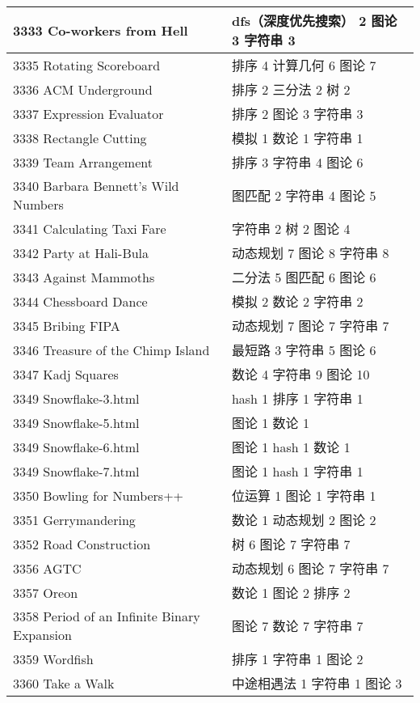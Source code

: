 \begin{longtable}{| p{} | p{} |}
 3333 Co-workers from Hell  & dfs（深度优先搜索） 2 图论 3 字符串 3 \\ \hline
 3335 Rotating Scoreboard  & 排序 4 计算几何 6 图论 7 \\ \hline
 3336 ACM Underground  & 排序 2 三分法 2 树 2 \\ \hline
 3337 Expression Evaluator  & 排序 2 图论 3 字符串 3 \\ \hline
 3338 Rectangle Cutting  & 模拟 1 数论 1 字符串 1 \\ \hline
 3339 Team Arrangement  & 排序 3 字符串 4 图论 6 \\ \hline
 3340 Barbara Bennett's Wild Numbers  & 图匹配 2 字符串 4 图论 5 \\ \hline
 3341 Calculating Taxi Fare  & 字符串 2 树 2 图论 4 \\ \hline
 3342 Party at Hali-Bula  & 动态规划 7 图论 8 字符串 8 \\ \hline
 3343 Against Mammoths  & 二分法 5 图匹配 6 图论 6 \\ \hline
 3344 Chessboard Dance  & 模拟 2 数论 2 字符串 2 \\ \hline
 3345 Bribing FIPA  & 动态规划 7 图论 7 字符串 7 \\ \hline
 3346 Treasure of the Chimp Island  & 最短路 3 字符串 5 图论 6 \\ \hline
 3347 Kadj Squares  & 数论 4 字符串 9 图论 10 \\ \hline
 3349 Snowflake-3.html & hash 1 排序 1 字符串 1 \\ \hline
 3349 Snowflake-5.html & 图论 1 数论 1 \\ \hline
 3349 Snowflake-6.html & 图论 1 hash 1 数论 1 \\ \hline
 3349 Snowflake-7.html & 图论 1 hash 1 字符串 1 \\ \hline
 3350 Bowling for Numbers++  & 位运算 1 图论 1 字符串 1 \\ \hline
 3351 Gerrymandering  & 数论 1 动态规划 2 图论 2 \\ \hline
 3352 Road Construction  & 树 6 图论 7 字符串 7 \\ \hline
 3356 AGTC  & 动态规划 6 图论 7 字符串 7 \\ \hline
 3357 Oreon  & 数论 1 图论 2 排序 2 \\ \hline
 3358 Period of an Infinite Binary Expansion  & 图论 7 数论 7 字符串 7 \\ \hline
 3359 Wordfish  & 排序 1 字符串 1 图论 2 \\ \hline
 3360 Take a Walk  & 中途相遇法 1 字符串 1 图论 3 \\ \hline

\end{longtable}
